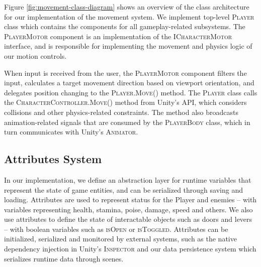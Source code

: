 Figure \ref{fig:movement-class-diagram} shows an overview of the class architecture for our implementation of the movement system. We implement top-level \textsc{Player} class which contains the components for all gameplay-related subsystems. The \textsc{PlayerMotor} component is an implementation of the \textsc{ICharacterMotor} interface, and is responsible for implementing the movement and physics logic of our motion controls.

When input is received from the user, the \textsc{PlayerMotor} component filters the input, calculates a target movement direction based on viewport orientation, and delegates position changing to the \textsc{Player.Move()} method. The \textsc{Player} class calls the \textsc{CharacterController.Move()} method from Unity's API, which considers collisions and other physics-related constraints. The  method also broadcasts animation-related signals that are consumed by the \textsc{PlayerBody} class, which in turn communicates with Unity's \textsc{Animator}.




\subsection{Attributes System}

In our implementation, we define an abstraction layer for runtime variables that represent the state of game entities, and can be serialized through saving and loading. Attributes are used to represent status for the Player and enemies -- with variables representing health, stamina, poise, damage, speed and others. We also use attributes to define the state of interactable objects such as doors and levers -- with boolean variables such as \textsc{isOpen} or \textsc{isToggled}. Attributes can be initialized, serialized and monitored by external systems, such as the native dependency injection in Unity's \textsc{Inspector} and our data persistence system which serializes runtime data through scenes.

